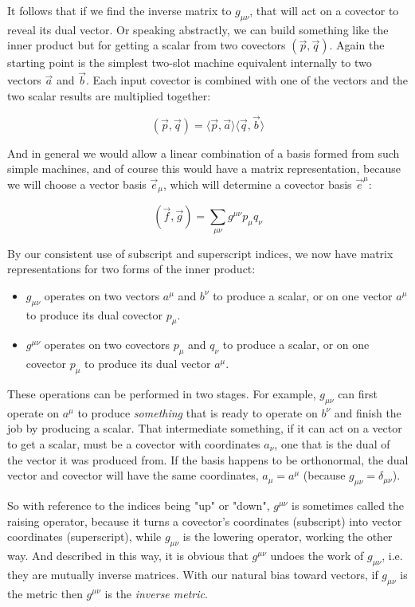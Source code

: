 It follows that if we find the inverse matrix to $g_{\mu\nu}$, that will act on a covector to reveal its dual vector. Or speaking abstractly, we can build something like the inner product but for getting a scalar from two covectors $(\vec{p}, \vec{q})$. Again the starting point is the simplest two-slot machine equivalent internally to two vectors $\vec{a}$ and $\vec{b}$. Each input covector is combined with one of the vectors and the two scalar results are multiplied together:

$$
(\vec{p}, \vec{q}) =
\langle \vec{p}, \vec{a} \rangle
\langle \vec{q}, \vec{b} \rangle
$$

And in general we would allow a linear combination of a basis formed from such simple machines, and of course this would have a matrix representation, because we will choose a vector basis $\vec{e}_{\mu}$, which will determine a covector basis $\vec{e}^{\mu}$:

$$
(\vec{f},\vec{g}) = \sum_{\mu\nu} g^{\mu\nu} p_{\mu} q_{\nu} 
$$

By our consistent use of subscript and superscript indices, we now have matrix representations for two forms of the inner product:

\begin{itemize}
    \item $g_{\mu\nu}$ operates on two vectors $a^{\mu}$ and $b^{\nu}$ to produce a scalar, or on one vector $a^{\mu}$ to produce its dual covector $p_{\mu}$.
    \item $g^{\mu\nu}$ operates on two covectors $p_{\mu}$ and $q_{\nu}$ to produce a scalar, or on one covector $p_{\mu}$ to produce its dual vector $a^{\mu}$. 
\end{itemize}

These operations can be performed in two stages. For example, $g_{\mu\nu}$ can first operate on $a^{\mu}$ to produce \textit{something} that is ready to operate on $b^{\nu}$ and finish the job by producing a scalar. That intermediate something, if it can act on a vector to get a scalar, must be a covector with coordinates $a_{\nu}$, one that is the dual of the vector it was produced from. If the basis happens to be orthonormal, the dual vector and covector will have the same coordinates, $a_{\mu} = a^{\mu}$ (because $g_{\mu\nu} = \delta_{\mu\nu}$).

So with reference to the indices being "up" or "down", $g^{\mu\nu}$ is sometimes called the raising operator, because it turns a covector's coordinates (subscript) into vector coordinates (superscript), while $g_{\mu\nu}$ is the lowering operator, working the other way. And described in this way, it is obvious that $g^{\mu\nu}$ undoes the work of $g_{\mu\nu}$, i.e. they are mutually inverse matrices. With our natural bias toward vectors, if $g_{\mu\nu}$ is the metric then $g^{\mu\nu}$ is the \textit{inverse metric}.

